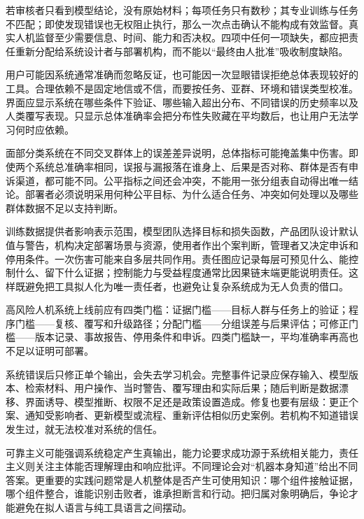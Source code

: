 若审核者只看到模型结论，没有原始材料；每项任务只有数秒；其专业训练与任务不匹配；即使发现错误也无权阻止执行，那么一次点击确认不能构成有效监督。真实人机监督至少需要信息、时间、能力和否决权。四项中任何一项缺失，都应把责任重新分配给系统设计者与部署机构，而不能以“最终由人批准”吸收制度缺陷。

用户可能因系统通常准确而忽略反证，也可能因一次显眼错误拒绝总体表现较好的工具。合理依赖不是固定地信或不信，而要按任务、亚群、环境和错误类型校准。界面应显示系统在哪些条件下验证、哪些输入超出分布、不同错误的历史频率以及人类覆写表现。只显示总体准确率会把分布性失败藏在平均数后，也让用户无法学习何时应依赖。

面部分类系统在不同交叉群体上的误差差异说明，总体指标可能掩盖集中伤害\parencite{buolamwini2018}。即使两个系统总准确率相同，误报与漏报落在谁身上、后果是否对称、群体是否有申诉渠道，都可能不同。公平指标之间还会冲突，不能用一张分组表自动得出唯一结论。部署者必须说明采用何种公平目标、为什么适合任务、冲突如何处理以及哪些群体数据不足以支持判断。

训练数据提供者影响表示范围，模型团队选择目标和损失函数，产品团队设计默认值与警告，机构决定部署场景与资源，使用者作出个案判断，管理者又决定申诉和停用条件。一次伤害可能来自多层共同作用。责任图应记录每层可预见什么、能控制什么、留下什么证据；控制能力与受益程度通常比因果链末端更能说明责任。这样既避免把工具拟人化为唯一责任者，也避免让复杂系统成为无人负责的借口。

\begin{argumentbox}
高风险人机系统上线前应有四类门槛：证据门槛——目标人群与任务上的验证；程序门槛——复核、覆写和升级路径；分配门槛——分组误差与后果评估；可修正门槛——版本记录、事故报告、停用条件和申诉。四类门槛缺一，平均准确率再高也不足以证明可部署。
\end{argumentbox}

系统错误后只修正单个输出，会失去学习机会。完整事件记录应保存输入、模型版本、检索材料、用户操作、当时警告、覆写理由和实际后果；随后判断是数据漂移、界面诱导、模型推断、权限不足还是政策设置造成。修复也要有层级：更正个案、通知受影响者、更新模型或流程、重新评估相似历史案例。若机构不知道错误发生过，就无法校准对系统的信任。

可靠主义可能强调系统稳定产生真输出，能力论要求成功源于系统相关能力，责任主义则关注主体能否理解理由和响应批评。不同理论会对“机器本身知道”给出不同答案。更重要的实践问题常是人机整体是否产生可使用知识：哪个组件接触证据，哪个组件整合，谁能识别击败者，谁承担断言和行动。把归属对象明确后，争论才能避免在拟人语言与纯工具语言之间摆动。

